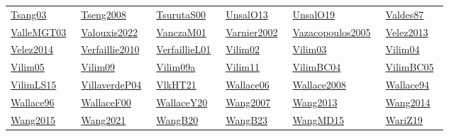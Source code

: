 \begin{longtable}{*{6}{l}}
\href{../works/Tsang03.pdf}{Tsang03}~\cite{Tsang03} & \href{../works/Tseng2008.pdf}{Tseng2008}~\cite{Tseng2008} & \href{../}{TsurutaS00}~\cite{TsurutaS00} & \href{../works/UnsalO13.pdf}{UnsalO13}~\cite{UnsalO13} & \href{../works/UnsalO19.pdf}{UnsalO19}~\cite{UnsalO19} & \href{../works/Valdes87.pdf}{Valdes87}~\cite{Valdes87}\\ 
\href{../works/ValleMGT03.pdf}{ValleMGT03}~\cite{ValleMGT03} & \href{../works/Valouxis2022.pdf}{Valouxis2022}~\cite{Valouxis2022} & \href{../works/VanczaM01.pdf}{VanczaM01}~\cite{VanczaM01} & \href{../works/Varnier2002.pdf}{Varnier2002}~\cite{Varnier2002} & \href{../}{Vazacopoulos2005}~\cite{Vazacopoulos2005} & \href{../works/Velez2013.pdf}{Velez2013}~\cite{Velez2013}\\ 
\href{../works/Velez2014.pdf}{Velez2014}~\cite{Velez2014} & \href{../works/Verfaillie2010.pdf}{Verfaillie2010}~\cite{Verfaillie2010} & \href{../works/VerfaillieL01.pdf}{VerfaillieL01}~\cite{VerfaillieL01} & \href{../works/Vilim02.pdf}{Vilim02}~\cite{Vilim02} & \href{../works/Vilim03.pdf}{Vilim03}~\cite{Vilim03} & \href{../works/Vilim04.pdf}{Vilim04}~\cite{Vilim04}\\ 
\href{../works/Vilim05.pdf}{Vilim05}~\cite{Vilim05} & \href{../works/Vilim09.pdf}{Vilim09}~\cite{Vilim09} & \href{../works/Vilim09a.pdf}{Vilim09a}~\cite{Vilim09a} & \href{../works/Vilim11.pdf}{Vilim11}~\cite{Vilim11} & \href{../works/VilimBC04.pdf}{VilimBC04}~\cite{VilimBC04} & \href{../works/VilimBC05.pdf}{VilimBC05}~\cite{VilimBC05}\\ 
\href{../works/VilimLS15.pdf}{VilimLS15}~\cite{VilimLS15} & \href{../}{VillaverdeP04}~\cite{VillaverdeP04} & \href{../works/VlkHT21.pdf}{VlkHT21}~\cite{VlkHT21} & \href{../works/Wallace06.pdf}{Wallace06}~\cite{Wallace06} & \href{../}{Wallace2008}~\cite{Wallace2008} & \href{../}{Wallace94}~\cite{Wallace94}\\ 
\href{../works/Wallace96.pdf}{Wallace96}~\cite{Wallace96} & \href{../works/WallaceF00.pdf}{WallaceF00}~\cite{WallaceF00} & \href{../works/WallaceY20.pdf}{WallaceY20}~\cite{WallaceY20} & \href{../works/Wang2007.pdf}{Wang2007}~\cite{Wang2007} & \href{../}{Wang2013}~\cite{Wang2013} & \href{../works/Wang2014.pdf}{Wang2014}~\cite{Wang2014}\\ 
\href{../works/Wang2015.pdf}{Wang2015}~\cite{Wang2015} & \href{../works/Wang2021.pdf}{Wang2021}~\cite{Wang2021} & \href{../works/WangB20.pdf}{WangB20}~\cite{WangB20} & \href{../works/WangB23.pdf}{WangB23}~\cite{WangB23} & \href{../works/WangMD15.pdf}{WangMD15}~\cite{WangMD15} & \href{../}{WariZ19}~\cite{WariZ19}\\ 

\end{longtable}
